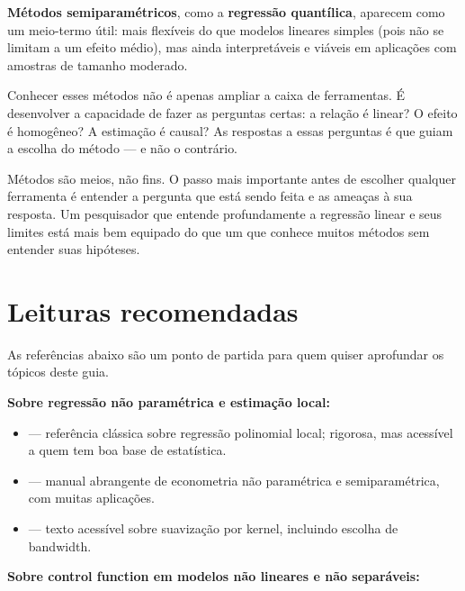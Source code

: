 \textbf{Métodos semiparamétricos}, como a \textbf{regressão quantílica}, aparecem
como um meio-termo útil: mais flexíveis do que modelos lineares simples (pois não se
limitam a um efeito médio), mas ainda interpretáveis e viáveis em aplicações com
amostras de tamanho moderado.

Conhecer esses métodos não é apenas ampliar a caixa de ferramentas. É desenvolver
a capacidade de fazer as perguntas certas: a relação é linear? O efeito é homogêneo?
A estimação é causal? As respostas a essas perguntas é que guiam a escolha do método
— e não o contrário.

\bigskip

\begin{destacebox}
Métodos são meios, não fins. O passo mais importante antes de escolher qualquer
ferramenta é entender a pergunta que está sendo feita e as ameaças à sua resposta.
Um pesquisador que entende profundamente a regressão linear e seus limites está
mais bem equipado do que um que conhece muitos métodos sem entender suas hipóteses.
\end{destacebox}

\chapter*{Leituras recomendadas}

As referências abaixo são um ponto de partida para quem quiser aprofundar os tópicos
deste guia.

\textbf{Sobre regressão não paramétrica e estimação local:}

\begin{itemize}
  \item \citet{fan_local_1996} — referência clássica sobre regressão polinomial
  local; rigorosa, mas acessível a quem tem boa base de estatística.
  \item \citet{li_nonparametric_2007} — manual abrangente de econometria não
  paramétrica e semiparamétrica, com muitas aplicações.
  \item \citet{wand_kernel_1994} — texto acessível sobre suavização por kernel,
  incluindo escolha de bandwidth.
\end{itemize}

\textbf{Sobre control function em modelos não lineares e não separáveis:}

